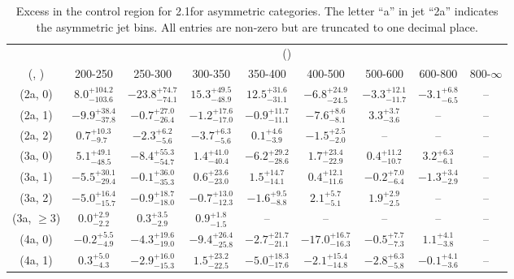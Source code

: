 \begin{table}[h!]
\tiny
\centering
\caption{Excess in the \mj control region for 2.1\ifb for asymmetric categories. The letter ``a'' in jet \eg ``2a''  indicates the asymmetric jet bins. All entries are non-zero but are truncated to one decimal place.\label{tab:excesssepnaive_mu_ewk_asym}}
\begin{tabular}
{ccccccccc}
	\hline\hline
	& \multicolumn{8}{c}{\scalht (\gev)} \\ 
	 (\njet,  \nb) & 200-250 & 250-300 & 300-350 & 350-400 & 400-500 & 500-600 & 600-800 & 800-$\infty$ \\ [0.8ex] 
\hline
	(2a, 0) & $8.0^{+ 104.2 }_{- 103.6 }$ & $-23.8^{+ 74.7 }_{- 74.1 }$ & $15.3^{+ 49.5 }_{- 48.9 }$ & $12.5^{+ 31.6 }_{- 31.1 }$ & $-6.8^{+ 24.9 }_{- 24.5 }$ & $-3.3^{+ 12.1 }_{- 11.7 }$ & $-3.1^{+ 6.8 }_{- 6.5 }$ & -- \\[0.5ex] 
	(2a, 1) & $-9.9^{+ 38.4 }_{- 37.8 }$ & $-0.7^{+ 27.0 }_{- 26.4 }$ & $-1.2^{+ 17.6 }_{- 17.0 }$ & $-0.9^{+ 11.7 }_{- 11.1 }$ & $-7.6^{+ 8.6 }_{- 8.1 }$ & $3.3^{+ 3.7 }_{- 3.6 }$ & -- & -- \\[0.5ex] 
	(2a, 2) & $0.7^{+ 10.3 }_{- 9.7 }$ & $-2.3^{+ 6.2 }_{- 5.6 }$ & $-3.7^{+ 6.3 }_{- 5.6 }$ & $0.1^{+ 4.6 }_{- 3.9 }$ & $-1.5^{+ 2.5 }_{- 2.0 }$ & -- & -- & -- \\[0.5ex] 
	(3a, 0) & $5.1^{+ 49.1 }_{- 48.5 }$ & $-8.4^{+ 55.3 }_{- 54.7 }$ & $1.4^{+ 41.0 }_{- 40.4 }$ & $-6.2^{+ 29.2 }_{- 28.6 }$ & $1.7^{+ 23.4 }_{- 22.9 }$ & $0.4^{+ 11.2 }_{- 10.7 }$ & $3.2^{+ 6.3 }_{- 6.1 }$ & -- \\[0.5ex] 
	(3a, 1) & $-5.5^{+ 30.1 }_{- 29.4 }$ & $-0.1^{+ 36.0 }_{- 35.3 }$ & $0.6^{+ 23.6 }_{- 23.0 }$ & $1.5^{+ 14.7 }_{- 14.1 }$ & $0.4^{+ 12.1 }_{- 11.6 }$ & $-0.2^{+ 7.0 }_{- 6.4 }$ & $-1.3^{+ 3.4 }_{- 2.9 }$ & -- \\[0.5ex] 
	(3a, 2) & $-5.0^{+ 16.4 }_{- 15.7 }$ & $-0.9^{+ 18.7 }_{- 18.0 }$ & $-0.7^{+ 13.0 }_{- 12.3 }$ & $-1.6^{+ 9.5 }_{- 8.8 }$ & $2.1^{+ 5.7 }_{- 5.1 }$ & $1.9^{+ 2.9 }_{- 2.5 }$ & -- & -- \\[0.5ex] 
	(3a, $\ge3$) & $0.0^{+ 2.9 }_{- 2.2 }$ & $0.3^{+ 3.5 }_{- 2.9 }$ & $0.9^{+ 1.8 }_{- 1.5 }$ & -- & -- & -- & -- & -- \\[0.5ex] 
	(4a, 0) & $-0.2^{+ 5.5 }_{- 4.9 }$ & $-4.3^{+ 19.6 }_{- 19.0 }$ & $-9.4^{+ 26.4 }_{- 25.8 }$ & $-2.7^{+ 21.7 }_{- 21.1 }$ & $-17.0^{+ 16.7 }_{- 16.3 }$ & $-0.5^{+ 7.7 }_{- 7.3 }$ & $1.1^{+ 4.1 }_{- 3.8 }$ & -- \\[0.5ex] 
	(4a, 1) & $0.3^{+ 5.0 }_{- 4.3 }$ & $-2.9^{+ 16.0 }_{- 15.3 }$ & $1.5^{+ 23.2 }_{- 22.5 }$ & $-5.0^{+ 18.3 }_{- 17.6 }$ & $-2.1^{+ 15.4 }_{- 14.8 }$ & $-2.8^{+ 6.3 }_{- 5.8 }$ & $-0.1^{+ 4.1 }_{- 3.6 }$ & -- \\[0.5ex] 

\end{tabular}
\end{table}
